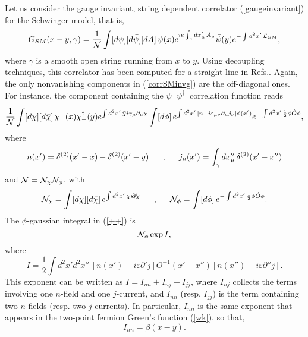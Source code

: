 \documentclass[a4paper,12pt]{article}
\begin{document}
Let us consider the gauge invariant, string dependent correlator (\ref{gaugeinvariant}) for the Schwinger model, that is,
\begin{equation}
G_{SM}(x-y,\gamma)=\frac{1}{\cal N}\int [d\psi][d\bar{\psi}][dA]\,
\psi(x)e^{ie\int_\gamma dx_\mu'\, A_\mu} \bar{\psi}(y) e^{-\int d^2x'\, {\cal L}_{SM}},
\label{corrSMinvg}
\end{equation}
where $\gamma$ is a smooth open string running from $x$ to $y$. Using decoupling techniques, this correlator has been computed for a straight line in Refs.\cite{sw,svz}.
Again, the only nonvanishing components in (\ref{corrSMinvg}) are the
off-diagonal ones. For instance, the component containing the $\psi_+ \psi^\dagger_+$ correlation function reads
\begin{equation}
\frac{1}{\cal N}\int [d\chi][d\bar{\chi}]\,\chi_+ (x)\chi^\dagger_+(y) e^{\int d^2x'\, \bar{\chi}i\gamma_{\mu}\partial_{\mu} \chi} \int [d\phi]\, e^{\int d^2x'\,[n-i\varepsilon_{\mu \nu}\partial_\mu j_\nu]\phi(x')} e^{-\int d^2x'\, \frac{1}{2}\phi\hat{O}\phi},
\label{++}
\end{equation}
where
\begin{equation}
n(x')=\delta^{(2)}(x'-x)-\delta^{(2)}(x'-y)\makebox[.5in]{,}
j_{\mu }(x')=\int_{\gamma }dx_\mu''\,\delta ^{(2)}(x'-x'')
\end{equation}
and ${\cal N}={\cal N}_\chi {\cal N}_\phi$, with
\begin{equation}
{\cal N}_\chi=\int [d\chi][d\bar{\chi}]\, e^{\int d^2x'\, \bar{\chi}i\not\!\partial \chi}
\makebox[.5in]{,}{\cal N}_\phi=\int [d\phi]\, e^{-\int d^2x'\, \frac{1}{2}\phi\hat{O}\phi}.
\end{equation}
The $\phi$-gaussian integral in (\ref{++}) is
\begin{equation}
{\cal N}_\phi \exp{I},
\label{gaussian}
\end{equation}
where
\begin{equation}
I=\frac{1}{2}\int d^2x' d^2x''\,[n(x')-i\varepsilon\partial' j ]
O^{-1}(x'-x'')[n(x'')-i\varepsilon\partial'' j ].
\label{expo}
\end{equation}
This exponent can be written as $I=I_{nn}+I_{nj}+I_{jj}$, where $I_{nj}$ collects the terms involving one $n$-field and one $j$-current, and $I_{nn}$ (resp. $I_{jj}$) is the term containing two $n$-fields (resp. two $j$-currents). In particular, $I_{nn}$ is the same exponent 
that appears in the two-point fermion Green's function (\ref{wk}), so that,
\begin{equation}
I_{nn}=\beta(x-y).
\end{equation}
\end{document}
